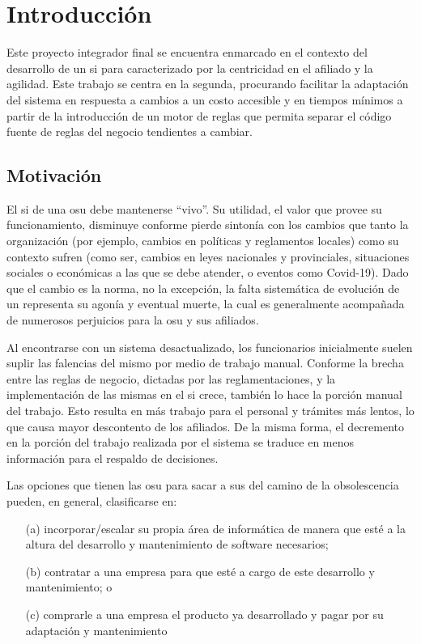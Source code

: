 \section{Introducción}\label{sec:intro}

Este proyecto integrador final se encuentra enmarcado en el contexto del desarrollo de un \acrfull{si} para  caracterizado por la centricidad en el afiliado y la agilidad. Este trabajo se centra en la segunda, procurando facilitar la adaptación del sistema en respuesta a cambios a un costo accesible y en tiempos mínimos a partir de la introducción de un motor de reglas que permita separar el código fuente de reglas del negocio tendientes a cambiar.

\subsection{Motivación}\label{ssec:motivacion}

El \acrshort{si} de una \acrshort{osu} debe mantenerse ``vivo''. 
Su utilidad, el valor que provee su funcionamiento, disminuye conforme pierde sintonía con los cambios que tanto la organización (por ejemplo, cambios en políticas y reglamentos locales) como su contexto sufren (como ser, cambios en leyes nacionales y provinciales, situaciones sociales o económicas a las que se debe atender, o eventos como Covid-19).
Dado que el cambio es la norma, no la excepción, la falta sistemática de evolución de un {\SIOSU} representa su agonía y eventual muerte, la cual es generalmente acompañada de numerosos perjuicios para la \acrshort{osu} y sus afiliados.

Al encontrarse con un sistema desactualizado, los funcionarios inicialmente suelen suplir las falencias del mismo por medio de trabajo manual. Conforme la brecha entre las reglas de negocio, dictadas por las reglamentaciones, y la implementación de las mismas en el \acrshort{si} crece, también lo hace la porción manual del trabajo. Esto resulta en más trabajo para el personal y trámites más lentos, lo que causa mayor descontento de los afiliados. De la misma forma, el decremento en la porción del trabajo realizada por el sistema se traduce en menos información para el respaldo de decisiones.

Las opciones que tienen las \acrshort{osu} para sacar a sus  del camino de la obsolescencia pueden, en general, clasificarse en:

\begin{enumerate}
    \item [(a)] incorporar/escalar su propia área de informática de manera que esté a la altura del desarrollo y mantenimiento de software necesarios;
    \item [(b)] contratar a una empresa para que esté a cargo de este desarrollo y mantenimiento; o
    \item [(c)] comprarle a una empresa el producto ya desarrollado y pagar por su adaptación y mantenimiento 
\end{enumerate} 

